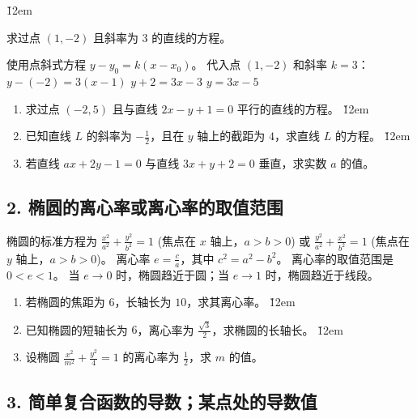 \v{12em}

\begin{example}
    求过点 $(1, -2)$ 且斜率为 $3$ 的直线的方程。
\end{example}
\begin{solution}
    使用点斜式方程 $y - y_0 = k(x - x_0)$。
    代入点 $(1, -2)$ 和斜率 $k=3$：
    $y - (-2) = 3(x - 1)$
    $y + 2 = 3x - 3$
    $y = 3x - 5$
\end{solution}

\begin{problem}
\begin{enumerate}
    \item 求过点 $(-2, 5)$ 且与直线 $2x - y + 1 = 0$ 平行的直线的方程。
          \v{12em}
    \item 已知直线 $L$ 的斜率为 $-\frac{1}{2}$，且在 $y$ 轴上的截距为 $4$，求直线 $L$ 的方程。
          \v{12em}
    \item 若直线 $ax + 2y - 1 = 0$ 与直线 $3x + y + 2 = 0$ 垂直，求实数 $a$ 的值。
\end{enumerate}
\end{problem}

\subsection*{2. 椭圆的离心率或离心率的取值范围}
\begin{theorem}
    椭圆的标准方程为 $\frac{x^2}{a^2} + \frac{y^2}{b^2} = 1$ (焦点在 $x$ 轴上，$a>b>0$) 或 $\frac{y^2}{a^2} + \frac{x^2}{b^2} = 1$ (焦点在 $y$ 轴上，$a>b>0$)。
    离心率 $e = \frac{c}{a}$，其中 $c^2 = a^2 - b^2$。
    离心率的取值范围是 $0 < e < 1$。
    当 $e \to 0$ 时，椭圆趋近于圆；当 $e \to 1$ 时，椭圆趋近于线段。
\end{theorem}

\begin{problem}
\begin{enumerate}
    \item 若椭圆的焦距为 $6$，长轴长为 $10$，求其离心率。
          \v{12em}
    \item 已知椭圆的短轴长为 $6$，离心率为 $\frac{\sqrt{3}}{2}$，求椭圆的长轴长。
          \v{12em}
    \item 设椭圆 $\frac{x^2}{m^2} + \frac{y^2}{4} = 1$ 的离心率为 $\frac{1}{2}$，求 $m$ 的值。
\end{enumerate}
\end{problem}

\subsection*{3. 简单复合函数的导数；某点处的导数值}

